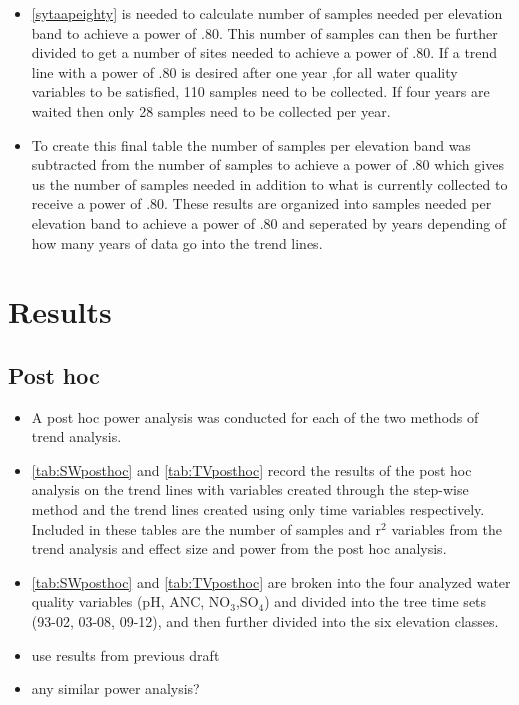 \begin{itemize}
	\item \autoref{sytaapeighty} is needed to calculate number of samples needed per elevation band to achieve a power of .80.  This number of samples can then be further divided to get a number of sites needed to achieve a power of .80.  If a trend line with a power of .80 is desired after one year ,for all water quality variables to be satisfied, 110 samples need to be collected.  If four years are waited then only 28 samples need to be collected per year.
	\item  To create this final table the number of samples per elevation  band was subtracted from the number of samples to achieve a power of .80 which gives us the number of samples needed in addition to what is currently collected to receive a power of .80.  These results are organized into samples needed per elevation band to achieve a power of .80 and seperated by years depending of how many years of data go into the trend lines.

\end{itemize}
\section{Results}
\subsection{Post hoc}
\begin{itemize}
	\item A post hoc power analysis was conducted for each of the two methods of trend analysis.
	\item \autoref{tab:SWposthoc} and \autoref{tab:TVposthoc} record the results of the post hoc analysis on the trend lines with variables created through the step-wise method and the trend lines created using only time variables respectively.  Included in these tables are the number of samples and r$^2$ variables from the trend analysis and effect size and power from the post hoc analysis.
	\item \autoref{tab:SWposthoc} and \autoref{tab:TVposthoc} are broken into the four analyzed water quality variables (pH, ANC, NO$_3$,SO$_4$) and divided into the tree time sets (93-02, 03-08, 09-12), and then further divided into the six elevation classes.
	\item use results from previous draft
	\item any similar power analysis?
\end{itemize}
